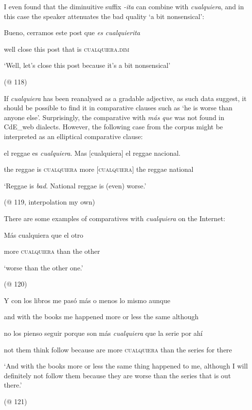 I even found that the diminuitive suffix \textit{-ita} can combine with \textit{cualquiera}, and in this case the speaker attenuates the bad quality ‘a bit nonsensical’:

    Bueno,  cerramos  este  post  que  \textit{es  cualquierita}

    well  close  this  post  that  is  \textsc{cualquiera}.\textsc{dim}

    ‘Well, let’s close this post because it’s a bit nonsensical’

    (@ 118) 

If \textit{cualquiera} has been reanalysed as a gradable adjective, as such data suggest, it should be possible to find it in comparative clauses such as ‘he is worse than anyone else’. Surprisingly, the comparative with \textit{más que} was not found in CdE\_web dialects. However, the following case from the corpus might be interpreted as an elliptical comparative clause:

    el  reggae  es  \textit{cualquiera}.  Mas  [cualquiera]   el  reggae  nacional.  

    the  reggae  is  \textsc{cualquiera}  more  \textsc{[cualquiera]}  the  reggae  national  

    ‘Reggae is \textit{bad}. National reggae is (even) worse.’

    (@ 119, interpolation my own)

There are some examples of comparatives with \textit{cualquiera} on the Internet:

    Más  cualquiera  que  el  otro          

    more  \textsc{cualquiera}  than  the  other          

    ‘worse than the other one.’

    (@ 120)

    Y  con  los  libros  me  pasó  más  o  menos  lo  mismo  aunque

    and  with  the  books  me  happened  more  or  less  the  same  although

    no  los  pienso  seguir  porque  son  más  \textit{cualquiera} que  la  serie  por  ahí

    not  them  think  follow  because  are  more  \textsc{cualquiera}  than  the  series  for  there

    ‘And with the books more or less the same thing happened to me, although I will definitely not follow them because they are worse than the series that is out there.’

    (@ 121)


